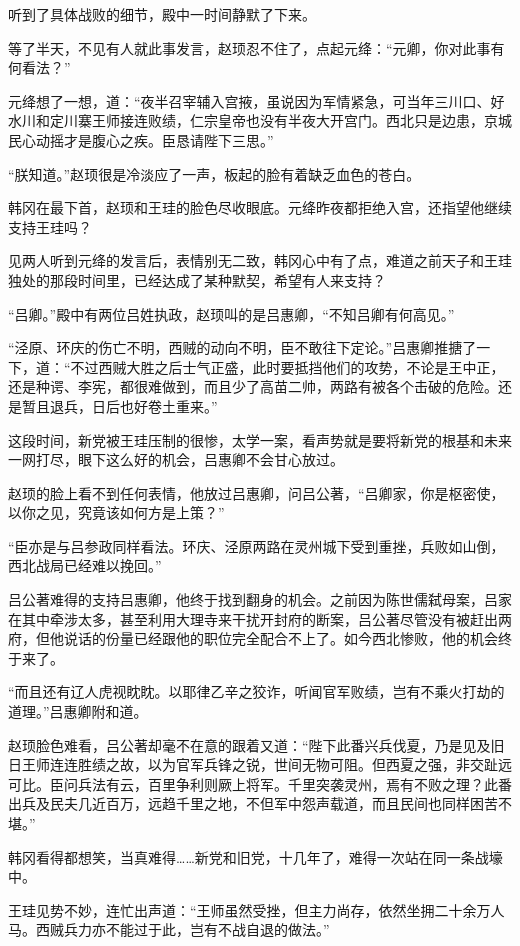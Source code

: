 听到了具体战败的细节，殿中一时间静默了下来。

等了半天，不见有人就此事发言，赵顼忍不住了，点起元绛：“元卿，你对此事有何看法？”

元绛想了一想，道：“夜半召宰辅入宫掖，虽说因为军情紧急，可当年三川口、好水川和定川寨王师接连败绩，仁宗皇帝也没有半夜大开宫门。西北只是边患，京城民心动摇才是腹心之疾。臣恳请陛下三思。”

“朕知道。”赵顼很是冷淡应了一声，板起的脸有着缺乏血色的苍白。

韩冈在最下首，赵顼和王珪的脸色尽收眼底。元绛昨夜都拒绝入宫，还指望他继续支持王珪吗？

见两人听到元绛的发言后，表情别无二致，韩冈心中有了点，难道之前天子和王珪独处的那段时间里，已经达成了某种默契，希望有人来支持？

“吕卿。”殿中有两位吕姓执政，赵顼叫的是吕惠卿，“不知吕卿有何高见。”

“泾原、环庆的伤亡不明，西贼的动向不明，臣不敢往下定论。”吕惠卿推搪了一下，道：“不过西贼大胜之后士气正盛，此时要抵挡他们的攻势，不论是王中正，还是种谔、李宪，都很难做到，而且少了高苗二帅，两路有被各个击破的危险。还是暂且退兵，日后也好卷土重来。”

这段时间，新党被王珪压制的很惨，太学一案，看声势就是要将新党的根基和未来一网打尽，眼下这么好的机会，吕惠卿不会甘心放过。

赵顼的脸上看不到任何表情，他放过吕惠卿，问吕公著，“吕卿家，你是枢密使，以你之见，究竟该如何方是上策？”

“臣亦是与吕参政同样看法。环庆、泾原两路在灵州城下受到重挫，兵败如山倒，西北战局已经难以挽回。”

吕公著难得的支持吕惠卿，他终于找到翻身的机会。之前因为陈世儒弑母案，吕家在其中牵涉太多，甚至利用大理寺来干扰开封府的断案，吕公著尽管没有被赶出两府，但他说话的份量已经跟他的职位完全配合不上了。如今西北惨败，他的机会终于来了。

“而且还有辽人虎视眈眈。以耶律乙辛之狡诈，听闻官军败绩，岂有不乘火打劫的道理。”吕惠卿附和道。

赵顼脸色难看，吕公著却毫不在意的跟着又道：“陛下此番兴兵伐夏，乃是见及旧日王师连连胜绩之故，以为官军兵锋之锐，世间无物可阻。但西夏之强，非交趾远可比。臣问兵法有云，百里争利则厥上将军。千里突袭灵州，焉有不败之理？此番出兵及民夫几近百万，远趋千里之地，不但军中怨声载道，而且民间也同样困苦不堪。”

韩冈看得都想笑，当真难得……新党和旧党，十几年了，难得一次站在同一条战壕中。

王珪见势不妙，连忙出声道：“王师虽然受挫，但主力尚存，依然坐拥二十余万人马。西贼兵力亦不能过于此，岂有不战自退的做法。”


